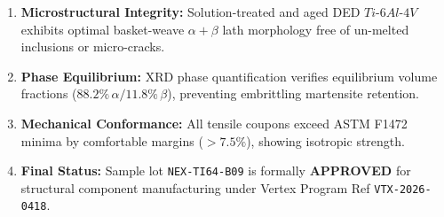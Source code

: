 \documentclass[10pt,a4paper,parskip=half]{scrartcl}
\begin{document}
\begin{tcolorbox}[colframe=brandprimary, colback=brandlight, left=5pt, right=5pt, top=3pt, bottom=3pt]
\small
\begin{enumerate}[leftmargin=*, label=\bfseries\color{brandprimary}\arabic*.]
    \item \textbf{Microstructural Integrity:} Solution-treated and aged DED $Ti\text{-}6Al\text{-}4V$ exhibits optimal basket-weave $\alpha+\beta$ lath morphology free of un-melted inclusions or micro-cracks.
    \item \textbf{Phase Equilibrium:} XRD phase quantification verifies equilibrium volume fractions ($88.2\%\,\alpha / 11.8\%\,\beta$), preventing embrittling martensite retention.
    \item \textbf{Mechanical Conformance:} All tensile coupons exceed ASTM F1472 minima by comfortable margins ($> 7.5\%$), showing isotropic strength.
    \item \textbf{Final Status:} Sample lot \texttt{NEX-TI64-B09} is formally \textbf{APPROVED} for structural component manufacturing under Vertex Program Ref \texttt{VTX-2026-0418}.
\end{enumerate}
\end{tcolorbox}

\vspace{2mm}
\end{document}
